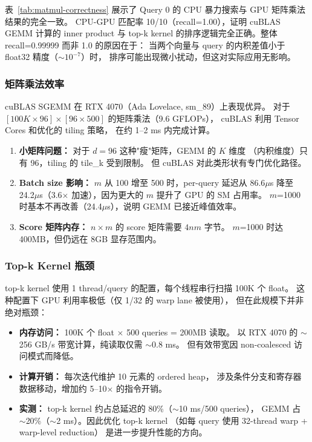 \documentclass[UTF8,a4paper,10pt]{ctexart}
\begin{document}
表~\ref{tab:matmul-correctness} 展示了 Query 0 的 CPU 暴力搜索与 GPU 矩阵乘法结果的完全一致。
CPU-GPU 匹配率 10/10（recall=1.00），证明 cuBLAS GEMM 计算的 inner product 与
top-k kernel 的排序逻辑完全正确。整体 recall=0.99999 而非 1.0 的原因在于：
当两个向量与 query 的内积差值小于 float32 精度（$\sim 10^{-7}$）时，
排序可能出现微小扰动，但这对实际应用无影响。

\subsubsection{矩阵乘法效率}

cuBLAS SGEMM 在 RTX 4070（Ada Lovelace, sm\_89）上表现优异。
对于 $[100K \times 96] \times [96 \times 500]$ 的矩阵乘法（9.6 GFLOPs），
cuBLAS 利用 Tensor Cores 和优化的 tiling 策略，
在约 1--2 ms 内完成计算。

\begin{enumerate}[itemsep=0pt]
\item \textbf{小矩阵问题：} 对于 $d=96$ 这种"瘦"矩阵，GEMM 的 $K$ 维度
（内积维度）只有 96，tiling 的 tile\_k 受到限制。
但 cuBLAS 对此类形状有专门优化路径。
\item \textbf{Batch size 影响：} $m$ 从 100 增至 500 时，per-query 延迟从 86.6$\mu$s
降至 24.2$\mu$s（3.6$\times$ 加速），因为更大的 $m$ 提升了 GPU 的 SM 占用率。
$m$=1000 时基本不再改善（24.4$\mu$s），说明 GEMM 已接近峰值效率。
\item \textbf{Score 矩阵内存：} $n \times m$ 的 score 矩阵需要 $4nm$ 字节。
$m$=1000 时达 400MB，但仍远在 8GB 显存范围内。
\end{enumerate}

\subsubsection{Top-k Kernel 瓶颈}

top-k kernel 使用 1 thread/query 的配置，每个线程串行扫描 100K 个 float。
这种配置下 GPU 利用率极低（仅 1/32 的 warp lane 被使用），
但在此规模下并非绝对瓶颈：

\begin{itemize}[itemsep=0pt]
\item \textbf{内存访问：} 100K 个 float $\times$ 500 queries = 200MB 读取。
以 RTX 4070 的 $\sim$256 GB/s 带宽计算，纯读取仅需 $\sim$0.8 ms。
但有效带宽因 non-coalesced 访问模式而降低。
\item \textbf{计算开销：} 每次迭代维护 10 元素的 ordered heap，
涉及条件分支和寄存器数据移动，增加约 5--10$\times$ 的指令开销。
\item \textbf{实测：} top-k kernel 约占总延迟的 80\%（$\sim$10 ms/500 queries），
GEMM 占 $\sim$20\%（$\sim$2 ms）。因此优化 top-k kernel
（如每 query 使用 32-thread warp + warp-level reduction）
是进一步提升性能的方向。
\end{itemize}
\end{document}
